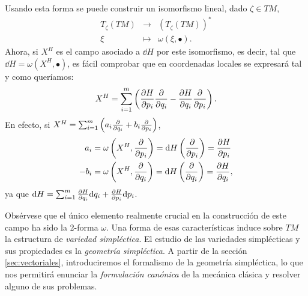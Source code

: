 Usando esta forma se puede construir un isomorfismo lineal, dado $\zeta \in TM$,
\begin{equation}
  \label{isomorfismo}
  \begin{array}{rcl}
     T_{\zeta}(TM) & \longrightarrow & (T_{\zeta}(TM))^* \\
    \xi & \longmapsto & \omega(\xi, \bullet).
  \end{array}
\end{equation}
Ahora, si $X^H$ es el campo asociado a $\dd H$ por este isomorfismo, es decir, tal que $\dd H=\omega(X^H,\bullet)$, es fácil comprobar que en coordenadas locales se expresará tal y como queríamos:
\begin{equation*}
  X^H = \sum_{i=1}^m \left( \frac{\partial H}{\partial p_i} \frac{\partial}{\partial q_i} - \frac{\partial H}{\partial q_i} \frac{\partial}{\partial p_i} \right).
\end{equation*}
En efecto, si $X^H=\sum_{i=1}^m \left( a_i \frac{\partial}{\partial q_i} + b_i \frac{\partial}{\partial p_i} \right)$,
\begin{align*}
  a_i&=\omega\left(X^H,\frac{\partial}{\partial p_i}\right)=\mathrm{d} H\left( \frac{\partial}{\partial p_i} \right)=\frac{\partial H}{\partial p_i} \\
  -b_i&=\omega\left(X^H,\frac{\partial}{\partial q_i}\right)=\mathrm{d} H\left( \frac{\partial}{\partial q_i} \right)=\frac{\partial H}{\partial q_i},
\end{align*}
ya que $\mathrm{d} H = \sum_{i=1}^m\frac{\partial H}{\partial q_i}\mathrm{d} q_i + \frac{\partial H}{\partial p_i}\mathrm{d} p_i$.

Obsérvese que el único elemento realmente crucial en la construcción de este campo ha sido la 2-forma $\omega$. Una forma de esas características induce sobre $TM$ la estructura de \emph{variedad simpléctica}. El estudio de las variedades simplécticas y sus propiedades es la \emph{geometría simpléctica}. A partir de la sección \ref{sec:vectoriales}, introduciremos el formalismo de la geometría simpléctica, lo que nos permitirá enunciar la \emph{formulación canónica} de la mecánica clásica y resolver alguno de sus problemas.


